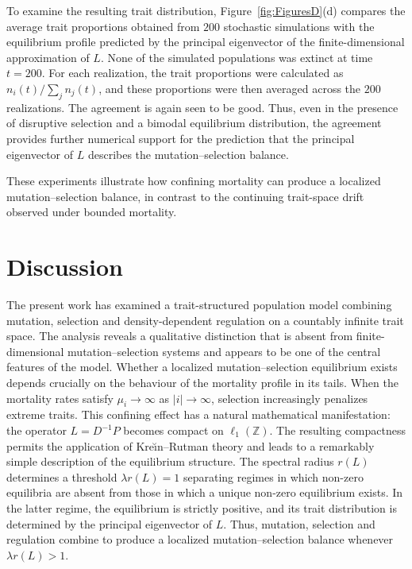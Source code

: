 \documentclass[12pt]{article}
\newcommand{\Z}{\ensuremath{\mathbb Z}}
\newcommand{\BS}{\ensuremath{\ell_1(\Z)}}
\begin{document}
To examine the resulting trait distribution,
Figure~\ref{fig:FiguresD}(d) compares the average trait proportions
obtained from $200$ stochastic simulations with the equilibrium profile
predicted by the principal eigenvector of the finite-dimensional
approximation of $L$. None of the simulated populations was extinct at
time $t=200$. For each realization, the trait proportions were
calculated as $n_i(t)/\sum_j n_j(t)$, and these proportions were then
averaged across the $200$ realizations. The agreement is again seen to
be good. Thus, even in the presence of disruptive selection and a
bimodal equilibrium distribution, the agreement provides further
numerical support for the prediction that the principal eigenvector of
$L$ describes the mutation--selection balance.

These experiments illustrate how confining mortality can produce a
localized mutation--selection balance, in contrast to the continuing
trait-space drift observed under bounded mortality.

\section{Discussion}
\label{sec:discussion}

The present work has examined a trait-structured population model
combining mutation, selection and density-dependent regulation on a
countably infinite trait space. The analysis reveals a qualitative
distinction that is absent from finite-dimensional mutation--selection
systems and appears to be one of the central features of the model.
Whether a localized mutation--selection equilibrium exists depends
crucially on the behaviour of the mortality profile in its tails.
When the mortality rates satisfy $\mu_i\to\infty$ as $|i|\to\infty$,
selection increasingly penalizes extreme traits. This confining effect
has a natural mathematical manifestation: the operator $L=D^{-1}P$
becomes compact on $\BS$. The resulting compactness permits the
application of Kre\u{\i}n--Rutman theory and leads to a remarkably
simple description of the equilibrium structure. The spectral radius
$r(L)$ determines a threshold $\lambda r(L)=1$ separating regimes in
which non-zero equilibria are absent from those in which a unique
non-zero equilibrium exists. In the latter regime, the equilibrium is
strictly positive, and its trait distribution is determined by the
principal eigenvector of $L$. Thus, mutation, selection and regulation
combine to produce a localized mutation--selection balance whenever
$\lambda r(L)>1$.
\end{document}
